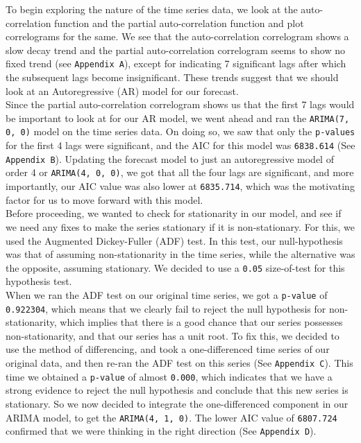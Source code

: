 \documentclass[12pt]{article}
\begin{document}
To begin exploring the nature of the time series data, we look at the auto-correlation function and the partial auto-correlation function and plot correlograms for the same. We see that the auto-correlation correlogram shows a slow decay trend and the partial auto-correlation correlogram seems to show no fixed trend (see \texttt{Appendix A}), except for indicating 7 significant lags after which the subsequent lags become insignificant. These trends suggest that we should look at an Autoregressive (AR) model for our forecast\cite{ar}.\\

Since the partial auto-correlation correlogram shows us that the first 7 lags would be important to look at for our AR model, we went ahead and ran the \texttt{ARIMA(7, 0, 0)} model on the time series data. On doing so, we saw that only the \texttt{p-values} for the first 4 lags were significant, and the AIC for this model was \texttt{6838.614} (See \texttt{Appendix B}). Updating the forecast model to just an autoregressive model of order 4 or \texttt{ARIMA(4, 0, 0)}, we got that all the four lags are significant, and more importantly, our AIC value was also lower at \texttt{6835.714}, which was the motivating factor for us to move forward with this model.\\

Before proceeding, we wanted to check for stationarity in our model, and see if we need any fixes to make the series stationary if it is non-stationary. For this, we used the Augmented Dickey-Fuller (ADF) test\cite{stationarity}. In this test, our null-hypothesis was that of assuming non-stationarity in the time series, while the alternative was the opposite, assuming stationary. We decided to use a \texttt{0.05} size-of-test for this hypothesis test.\\

When we ran the ADF test on our original time series, we got a \texttt{p-value} of \texttt{0.922304}, which means that we clearly fail to reject the null hypothesis for non-stationarity, which implies that there is a good chance that our series possesses non-stationarity, and that our series has a unit root. To fix this, we decided to use the method of differencing, and took a one-differenced time series of our original data, and then re-ran the ADF test on this series (See \texttt{Appendix C}). This time we obtained a \texttt{p-value} of almost \texttt{0.000}, which indicates that we have a strong evidence to reject the null hypothesis and conclude that this new series is stationary. So we now decided to integrate the one-differenced component in our ARIMA model, to get the \texttt{ARIMA(4, 1, 0)}. The lower AIC value of \texttt{6807.724} confirmed that we were thinking in the right direction (See \texttt{Appendix D}).\\
\end{document}
